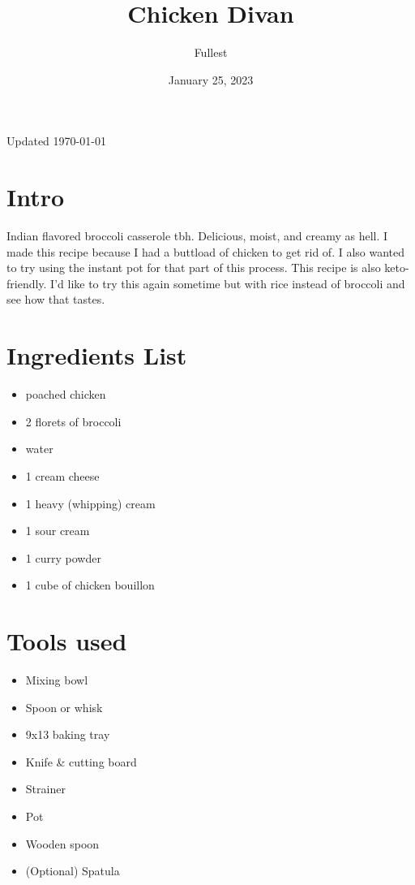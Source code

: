 \documentclass{article}
\title{\textbf{Chicken Divan}}
\author{Fullest}
\date{January 25, 2023}
\let\US\SI
\begin{document}
\maketitle
\thispagestyle{empty}

\begin{multicols}{2}


Updated \today
\section{Intro}
\cite{WEBSITEWITHRECIPE:1}Indian flavored broccoli casserole tbh. Delicious, moist, and creamy as hell. I made this recipe because I had a buttload of chicken to get rid of. I also wanted to try using the instant pot\cite{CHICKEN} for that part of this process. This recipe is also keto-friendly. I'd like to try this again sometime but with rice instead of broccoli and see how that tastes.

\section{Ingredients List}
\begin{itemize}
	\item poached chicken\cite{CHICKEN}
	\item 2 florets of broccoli
	\item water
	\item \US{1}{\cup} cream cheese
	\item \US{1}{\cup} heavy (whipping) cream
	\item \US{1}{\cup} sour cream
	\item \US{1}{\tbsp} curry powder\cite{CURRYPOWDER}
	\item 1 cube of chicken bouillon
\end{itemize}

\section{Tools used}
\begin{itemize}
	\item Mixing bowl
	\item Spoon or whisk
	\item 9x13 baking tray
	\item Knife \& cutting board
	\item Strainer
	\item Pot
	\item Wooden spoon
	\item (Optional) Spatula\\\\ %
\end{itemize}


\end{multicols}
\end{document}
